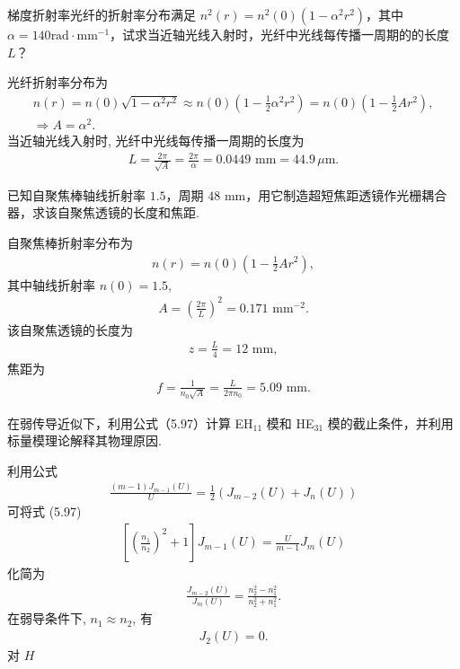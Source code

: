 \documentclass{assignment}
\begin{document}
\begin{prob}
    梯度折射率光纤的折射率分布满足 $n^2(r)=n^2(0)(1-\alpha^2r^2)$，其中 $\alpha=140\text{rad}\cdot\text{mm}^{-1}$，试求当近轴光线入射时，光纤中光线每传播一周期的的长度 $L$？
\end{prob}
\begin{sol}
    光纤折射率分布为
    \begin{gather}
        n(r)=n(0)\sqrt{1-\alpha^2r^2}\approx n(0)\left(1-\frac{1}{2}\alpha^2r^2\right)=n(0)\left(1-\frac{1}{2}Ar^2\right),\\
        \Longrightarrow A=\alpha^2.
    \end{gather}
    当近轴光线入射时, 光纤中光线每传播一周期的长度为
    \begin{align}
        L=\frac{2\pi}{\sqrt{A}}=\frac{2\pi}{\alpha}=0.0449\text{ mm}=44.9\,\mu\text{m}.
    \end{align}
\end{sol}

\begin{prob}
    已知自聚焦棒轴线折射率 $1.5$，周期 $48$ mm，用它制造超短焦距透镜作光栅耦合器，求该自聚焦透镜的长度和焦距.
\end{prob}
\begin{sol}
    自聚焦棒折射率分布为
    \begin{align}
        n(r)=n(0)\left(1-\frac{1}{2}Ar^2\right),
    \end{align}
    其中轴线折射率 $n(0)=1.5$,
    \begin{align}
        A=\left(\frac{2\pi}{L}\right)^2=0.171\text{ mm}^{-2}.
    \end{align}
    该自聚焦透镜的长度为
    \begin{align}
        z=\frac{L}{4}=12\text{ mm},
    \end{align}
    焦距为
    \begin{align}
        f=\frac{1}{n_0\sqrt{A}}=\frac{L}{2\pi n_0}=5.09\text{ mm}.
    \end{align}
\end{sol}

\begin{prob}
    在弱传导近似下，利用公式（5.97）计算 EH$_{11}$ 模和 HE$_{31}$ 模的截止条件，并利用标量模理论解释其物理原因.
\end{prob}
\begin{sol}
    利用公式
    \begin{align}
        \frac{(m-1)J_{m-1}(U)}{U}=\frac{1}{2}(J_{m-2}(U)+J_n(U))
    \end{align}
    可将式 (5.97)
    \begin{align}
        \left[\left(\frac{n_1}{n_2}\right)^2+1\right]J_{m-1}(U)=\frac{U}{m-1}J_m(U)
    \end{align}
    化简为
    \begin{align}
        \frac{J_{m-2}(U)}{J_m(U)}=\frac{n_2^2-n_1^2}{n_2^2+n_1^2}.
    \end{align}
    在弱导条件下, $n_1\approx n_2$, 有
    \begin{align}
        J_2(U)=0.
    \end{align}
    对 $H$
\end{sol}
\end{document}

